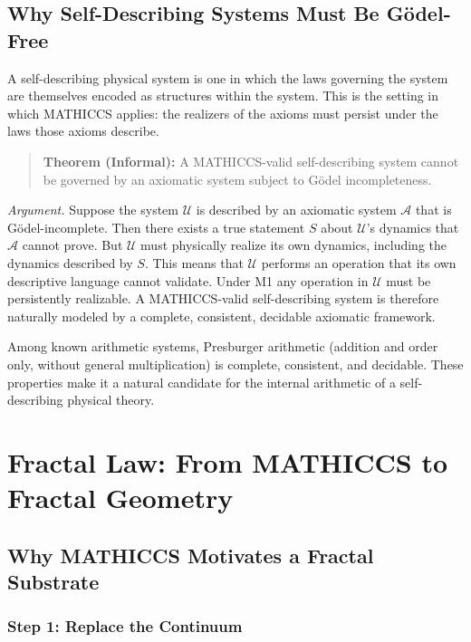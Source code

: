 \documentclass[11pt,a4paper]{article}
\begin{document}
\subsection{Why Self-Describing Systems Must Be G\"odel-Free}

A self-describing physical system is one in which the laws governing the system are themselves encoded as structures within the system. This is the setting in which MATHICCS applies: the realizers of the axioms must persist under the laws those axioms describe.

\begin{quote}
\textbf{Theorem (Informal):} A MATHICCS-valid self-describing system cannot be governed by an axiomatic system subject to G\"odel incompleteness.
\end{quote}

\textit{Argument.} Suppose the system $\mathcal{U}$ is described by an axiomatic system $\mathcal{A}$ that is G\"odel-incomplete. Then there exists a true statement $S$ about $\mathcal{U}$'s dynamics that $\mathcal{A}$ cannot prove. But $\mathcal{U}$ must physically realize its own dynamics, including the dynamics described by $S$. This means that $\mathcal{U}$ performs an operation that its own descriptive language cannot validate. Under M1 any operation in $\mathcal{U}$ must be persistently realizable. A MATHICCS-valid self-describing system is therefore naturally modeled by a complete, consistent, decidable axiomatic framework.

Among known arithmetic systems, Presburger arithmetic (addition and order only, without general multiplication) is complete, consistent, and decidable. These properties make it a natural candidate for the internal arithmetic of a self-describing physical theory.

\section{Fractal Law: From MATHICCS to Fractal Geometry}

\subsection{Why MATHICCS Motivates a Fractal Substrate}

\subsubsection{Step 1: Replace the Continuum}
\end{document}
